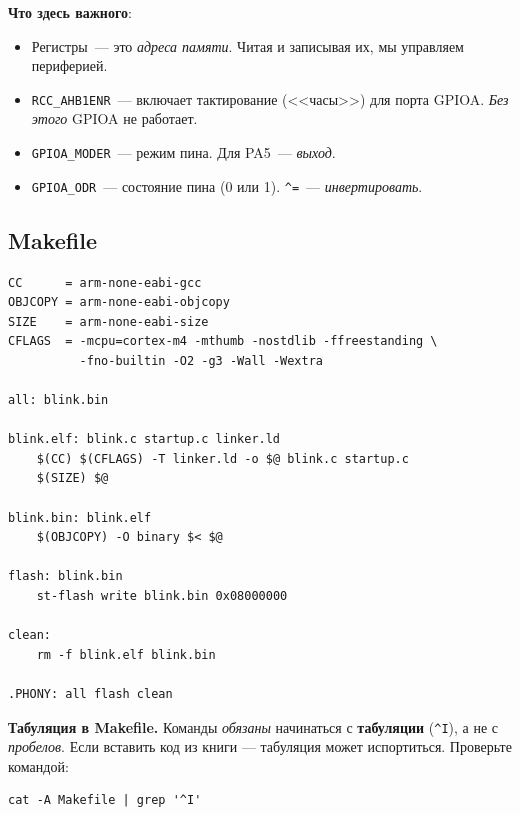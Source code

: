 \textbf{Что здесь важного}:

\begin{itemize}
    \item Регистры~--- это \emph{адреса памяти}. Читая
          и записывая их, мы управляем периферией.
    \item \texttt{RCC\_AHB1ENR}~--- включает тактирование
          (<<часы>>) для порта GPIOA. \emph{Без этого}
          GPIOA не работает.
    \item \texttt{GPIOA\_MODER}~--- режим пина. Для PA5~---
          \emph{выход}.
    \item \texttt{GPIOA\_ODR}~--- состояние пина (0 или 1).
          \texttt{\^{}=}~--- \emph{инвертировать}.
\end{itemize}

\subsection{Makefile}

\begin{listing}[htbp]
\begin{verbatim}
CC      = arm-none-eabi-gcc
OBJCOPY = arm-none-eabi-objcopy
SIZE    = arm-none-eabi-size
CFLAGS  = -mcpu=cortex-m4 -mthumb -nostdlib -ffreestanding \
          -fno-builtin -O2 -g3 -Wall -Wextra

all: blink.bin

blink.elf: blink.c startup.c linker.ld
    $(CC) $(CFLAGS) -T linker.ld -o $@ blink.c startup.c
    $(SIZE) $@

blink.bin: blink.elf
    $(OBJCOPY) -O binary $< $@

flash: blink.bin
    st-flash write blink.bin 0x08000000

clean:
    rm -f blink.elf blink.bin

.PHONY: all flash clean
\end{verbatim}
\caption{\texttt{Makefile}~--- сборка и прошивка мигания LED}
\label{lst:flashing-makefile}
\end{listing}


\begin{warnbox}
\textbf{Табуляция в Makefile.} Команды \emph{обязаны}
начинаться с \textbf{табуляции} (\texttt{\^{}I}), а не
с \emph{пробелов}. Если вставить код из книги — табуляция
может испортиться. Проверьте командой:
\begin{verbatim}
cat -A Makefile | grep '^I'
\end{verbatim}
\end{warnbox}

